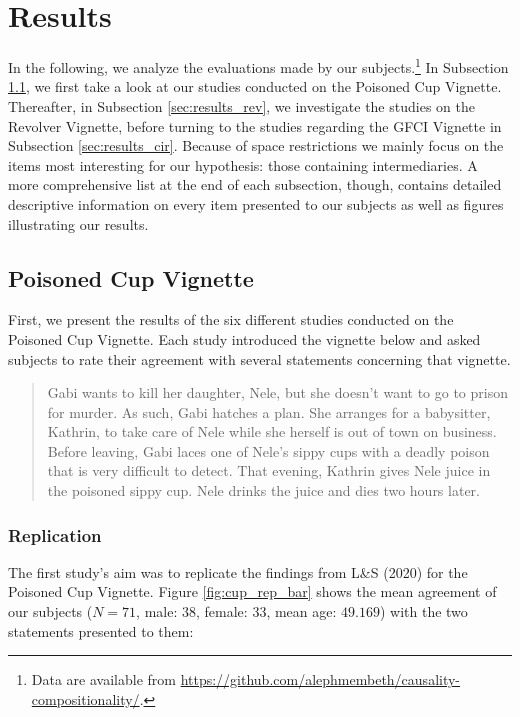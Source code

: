 \documentclass[egregdoesnotlikesansseriftitles,12pt]{scrartcl}
\begin{document}
\section{Results}\label{sec:results}
In the following, we analyze the evaluations made by our subjects.\footnote{Data are available from \url{https://github.com/alephmembeth/causality-compositionality/}.} In Subsection \ref{sec:results_cup}, we first take a look at our studies conducted on the Poisoned Cup Vignette. Thereafter, in Subsection \ref{sec:results_rev}, we investigate the studies on the Revolver Vignette, before turning to the studies regarding the GFCI Vignette in Subsection \ref{sec:results_cir}. Because of space restrictions we mainly focus on the items most interesting for our hypothesis: those containing intermediaries. A more comprehensive list at the end of each subsection, though, contains detailed descriptive information on every item presented to our subjects as well as figures illustrating our results.

\subsection{Poisoned Cup Vignette}\label{sec:results_cup}
First, we present the results of the six different studies conducted on the Poisoned Cup Vignette. Each study introduced the vignette below and asked subjects to rate their agreement with several statements concerning that vignette. 

\begin{quote}
   Gabi wants to kill her daughter, Nele, but she doesn't want to go to prison for murder. As such, Gabi hatches a plan. She arranges for a babysitter, Kathrin, to take care of Nele while she herself is out of town on business. Before leaving, Gabi laces one of Nele's sippy cups with a deadly poison that is very difficult to detect. That evening, Kathrin gives Nele juice in the poisoned sippy cup. Nele drinks the juice and dies two hours later.
\end{quote}

\subsubsection{Replication}\label{sec:results_cup_rep}
The first study's aim was to replicate the findings from L\&S (2020) for the Poisoned Cup Vignette. Figure \ref{fig:cup_rep_bar} shows the mean agreement of our subjects ($N=71$, male: $38$, female: $33$, mean age: $49.169$) with the two statements presented to them:
\end{document}
